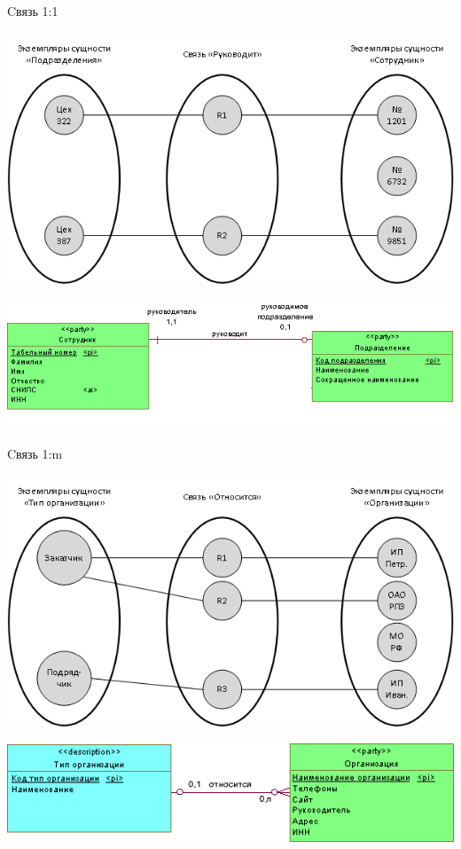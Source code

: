 \documentclass{beamer}
\begin{document}
\begin{frame}
\begin{block}{Cвязь 1:1}
\begin{center}
\includegraphics[scale=0.5]{images/one-one.png}
\end{center}
\begin{center}
\includegraphics[scale=0.5]{images/one-one-er.png}
\end{center}
\end{block}
\end{frame}

\begin{frame}
\begin{block}{Cвязь 1:m}
\begin{center}
\includegraphics[scale=0.5]{images/one-many.png}
\end{center}
\begin{center}
\includegraphics[scale=0.5]{images/one-many-er.png}
\end{center}
\end{block}
\end{frame}
\end{document}
